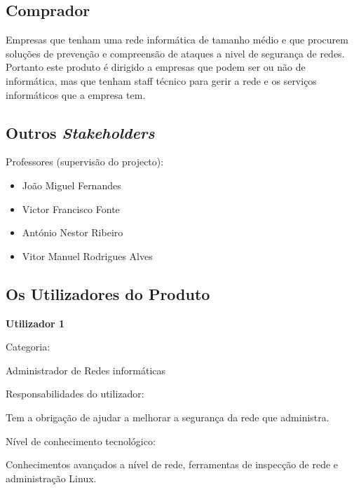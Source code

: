 \subsection{Comprador}
Empresas que tenham uma rede informática de tamanho médio e que procurem soluções de prevenção e compreensão de ataques a nivel de segurança de redes.
Portanto este produto é dirigido a empresas que podem ser ou não de informática, mas que tenham staff técnico para gerir a rede e os serviços
informáticos que a empresa tem.

\subsection{Outros \emph{Stakeholders}}
Professores (supervisão do projecto):
\begin{itemize}
\item João Miguel Fernandes
\item Victor Francisco Fonte
\item António Nestor Ribeiro
\item Vitor Manuel Rodrigues Alves
\end{itemize}
\subsection{Os Utilizadores do Produto}
\begin{description}
\item \textbf{Utilizador 1}
\item Categoria: 

Administrador de Redes informáticas
\item Responsabilidades do utilizador: 

Tem a obrigação de ajudar a melhorar a segurança da rede que administra.
\item Nível de conhecimento tecnológico: 

Conhecimentos avançados a nível de rede, ferramentas de inspecção de rede e administração Linux.
\end{description}


